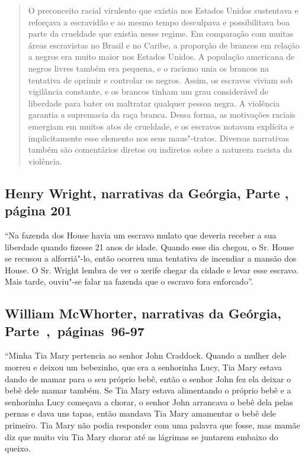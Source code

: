 \begin{quote}
O preconceito racial virulento que existia nos Estados Unidos
sustentava e reforçava a escravidão e ao mesmo tempo desculpava e
possibilitava boa parte da crueldade que existia nesse regime. Em
comparação com muitas áreas escravistas no Brasil e no Caribe, a
proporção de brancos em relação a negros era muito maior nos Estados
Unidos. A população americana de negros livres também era pequena, e o
racismo unia os brancos na tentativa de oprimir e controlar os negros.
Assim, os escravos viviam sob vigilância constante, e os brancos tinham
um grau considerável de liberdade para bater ou maltratar qualquer
pessoa negra. A violência garantia a supremacia da raça branca. Dessa
forma, as motivações raciais emergiam em muitos atos de crueldade, e os
escravos notavam explícita e implicitamente esse elemento nos seus
maus"-tratos. Diversas narrativas também são comentários diretos ou
indiretos sobre a natureza racista da violência.
\end{quote}

\subsection{Henry Wright, narrativas da Geórgia, Parte , página 201}
\label{ref318}

``Na fazenda dos House havia um escravo mulato que deveria receber a sua
liberdade quando fizesse 21 anos de idade. Quando esse dia chegou, o Sr.
House se recusou a alforriá"-lo, então ocorreu uma tentativa de incendiar
a mansão dos House. O Sr. Wright lembra de ver o xerife chegar da cidade
e levar esse escravo. Mais tarde, ouviu"-se falar na fazenda que o
escravo fora enforcado''.

\subsection{William McWhorter, narrativas da Geórgia, Parte~,~páginas~96-97}
\label{ref189}

``Minha Tia Mary pertencia ao senhor John Craddock. Quando a mulher dele
morreu e deixou um bebezinho, que era a senhorinha Lucy, Tia Mary estava
dando de mamar para o seu próprio bebê, então o senhor John fez ela
deixar o bebê dele mamar também. Se Tia Mary estava alimentando o
próprio bebê e a senhorinha Lucy começava a chorar, o senhor John
arrancava o bebê dela pelas pernas e dava uns tapas, então mandava Tia
Mary amamentar o bebê dele primeiro. Tia Mary não podia responder com
uma palavra que fosse, mas mamãe diz que muito viu Tia Mary chorar até
as lágrimas se juntarem embaixo do queixo.

